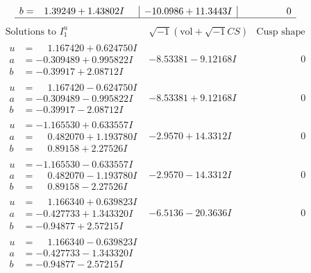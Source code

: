 \documentclass[1p]{elsarticle_modified}
\theoremstyle{definition}
\newcommand{\I}{\sqrt{-1}}
\begin{document}
$$\begin{array}{c|c|c}
\begin{aligned}
b &= \phantom{-}1.39249 + 1.43802 I\end{aligned}
 & -10.0986 + 11.3443 I & \phantom{-0.000000 } 0\\
 \hline 
 \end{array}$$\newpage$$\begin{array}{c|c|c}  
\text{Solutions to }I^u_{1}& \I (\text{vol} + \sqrt{-1}CS) & \text{Cusp shape}\\
 \hline 
\begin{aligned}
u &= \phantom{-}1.167420 + 0.624750 I \\
a &= -0.309489 + 0.995822 I \\
b &= -0.39917 + 2.08712 I\end{aligned}
 & -8.53381 - 9.12168 I & \phantom{-0.000000 } 0 \\ \hline\begin{aligned}
u &= \phantom{-}1.167420 - 0.624750 I \\
a &= -0.309489 - 0.995822 I \\
b &= -0.39917 - 2.08712 I\end{aligned}
 & -8.53381 + 9.12168 I & \phantom{-0.000000 } 0 \\ \hline\begin{aligned}
u &= -1.165530 + 0.633557 I \\
a &= \phantom{-}0.482070 + 1.193780 I \\
b &= \phantom{-}0.89158 + 2.27526 I\end{aligned}
 & -2.9570 + 14.3312 I & \phantom{-0.000000 } 0 \\ \hline\begin{aligned}
u &= -1.165530 - 0.633557 I \\
a &= \phantom{-}0.482070 - 1.193780 I \\
b &= \phantom{-}0.89158 - 2.27526 I\end{aligned}
 & -2.9570 - 14.3312 I & \phantom{-0.000000 } 0 \\ \hline\begin{aligned}
u &= \phantom{-}1.166340 + 0.639823 I \\
a &= -0.427733 + 1.343320 I \\
b &= -0.94877 + 2.57215 I\end{aligned}
 & -6.5136 - 20.3636 I & \phantom{-0.000000 } 0 \\ \hline\begin{aligned}
u &= \phantom{-}1.166340 - 0.639823 I \\
a &= -0.427733 - 1.343320 I \\
b &= -0.94877 - 2.57215 I\end{aligned}

\end{array}$$
\end{document}
